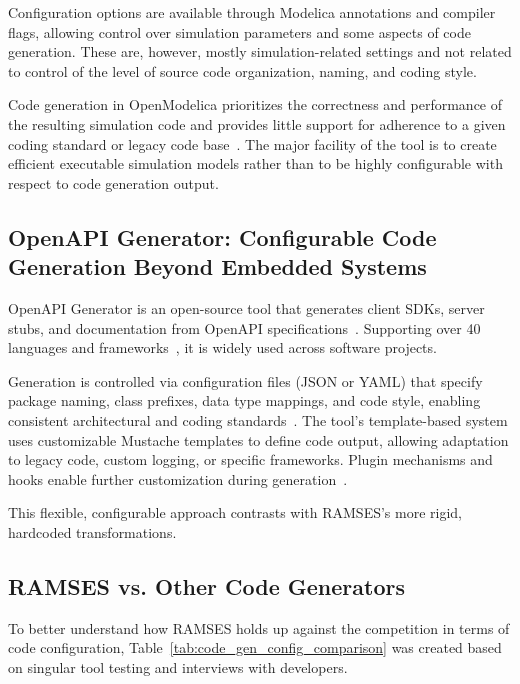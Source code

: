 Configuration options are available through Modelica annotations and compiler flags, allowing control over simulation parameters and some aspects of code generation. These are, however, mostly simulation-related settings and not related to control of the level of source code organization, naming, and coding style.

Code generation in OpenModelica prioritizes the correctness and performance of the resulting simulation code and provides little support for adherence to a given coding standard or legacy code base~\cite{openmodelica-performance}. The major facility of the tool is to create efficient executable simulation models rather than to be highly configurable with respect to code generation output.


\subsection*{OpenAPI Generator: Configurable Code Generation Beyond Embedded Systems}

OpenAPI Generator is an open-source tool that generates client SDKs, server stubs, and documentation from OpenAPI specifications~\cite{OpenAPITools}. Supporting over 40 languages and frameworks~\cite{openapi-generators}, it is widely used across software projects.

Generation is controlled via configuration files (JSON or \gls{YAML}) that specify package naming, class prefixes, data type mappings, and code style, enabling consistent architectural and coding standards~\cite{openapi-config}. The tool’s template-based system uses customizable Mustache templates to define code output, allowing adaptation to legacy code, custom logging, or specific frameworks. Plugin mechanisms and hooks enable further customization during generation~\cite{openapi-customization,openapi-plugins}.

This flexible, configurable approach contrasts with \gls{RAMSES}’s more rigid, hardcoded transformations.


\subsection*{RAMSES vs. Other Code Generators}

To better understand how \gls{RAMSES} holds up against the competition in terms of code configuration, Table~\ref{tab:code_gen_config_comparison} was created based on singular tool testing and interviews with developers.

